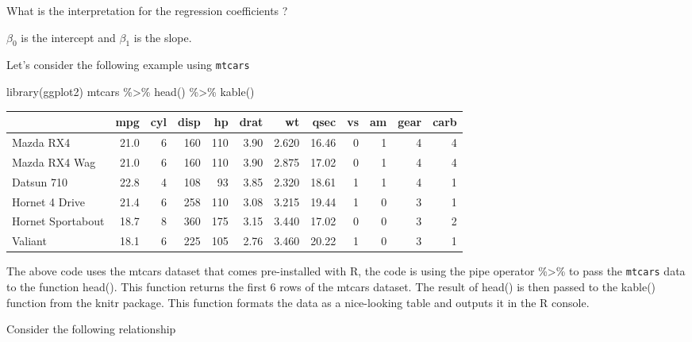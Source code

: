\documentclass[
  letterpaper,
  DIV=11,
  numbers=noendperiod]{scrartcl}
\newenvironment{Shaded}{\begin{snugshade}}{\end{snugshade}}
\newcommand{\AttributeTok}[1]{\textcolor[rgb]{0.40,0.45,0.13}{#1}}
\newcommand{\DecValTok}[1]{\textcolor[rgb]{0.68,0.00,0.00}{#1}}
\newcommand{\FunctionTok}[1]{\textcolor[rgb]{0.28,0.35,0.67}{#1}}
\newcommand{\NormalTok}[1]{\textcolor[rgb]{0.00,0.23,0.31}{#1}}
\newcommand{\OtherTok}[1]{\textcolor[rgb]{0.00,0.23,0.31}{#1}}
\newcommand{\SpecialCharTok}[1]{\textcolor[rgb]{0.37,0.37,0.37}{#1}}
\newcommand{\StringTok}[1]{\textcolor[rgb]{0.13,0.47,0.30}{#1}}
\begin{document}
What is the interpretation for the regression coefficients ?

\(\beta_0\) is the intercept and \(\beta_1\) is the slope.

Let's consider the following example using \texttt{mtcars}

\begin{Shaded}
\begin{Highlighting}[]
\FunctionTok{library}\NormalTok{(ggplot2)}
\NormalTok{mtcars }\SpecialCharTok{\%\textgreater{}\%} \FunctionTok{head}\NormalTok{() }\SpecialCharTok{\%\textgreater{}\%} \FunctionTok{kable}\NormalTok{()}
\end{Highlighting}
\end{Shaded}

\begin{tabular}{l|r|r|r|r|r|r|r|r|r|r|r}
\hline
  & mpg & cyl & disp & hp & drat & wt & qsec & vs & am & gear & carb\\
\hline
Mazda RX4 & 21.0 & 6 & 160 & 110 & 3.90 & 2.620 & 16.46 & 0 & 1 & 4 & 4\\
\hline
Mazda RX4 Wag & 21.0 & 6 & 160 & 110 & 3.90 & 2.875 & 17.02 & 0 & 1 & 4 & 4\\
\hline
Datsun 710 & 22.8 & 4 & 108 & 93 & 3.85 & 2.320 & 18.61 & 1 & 1 & 4 & 1\\
\hline
Hornet 4 Drive & 21.4 & 6 & 258 & 110 & 3.08 & 3.215 & 19.44 & 1 & 0 & 3 & 1\\
\hline
Hornet Sportabout & 18.7 & 8 & 360 & 175 & 3.15 & 3.440 & 17.02 & 0 & 0 & 3 & 2\\
\hline
Valiant & 18.1 & 6 & 225 & 105 & 2.76 & 3.460 & 20.22 & 1 & 0 & 3 & 1\\
\hline
\end{tabular}

The above code uses the mtcars dataset that comes pre-installed with R,
the code is using the pipe operator \%\textgreater\% to pass the
\texttt{mtcars} data to the function head(). This function returns the
first 6 rows of the mtcars dataset. The result of head() is then passed
to the kable() function from the knitr package. This function formats
the data as a nice-looking table and outputs it in the R console.

Consider the following relationship

\begin{Shaded}
\end{Shaded}
\end{document}
